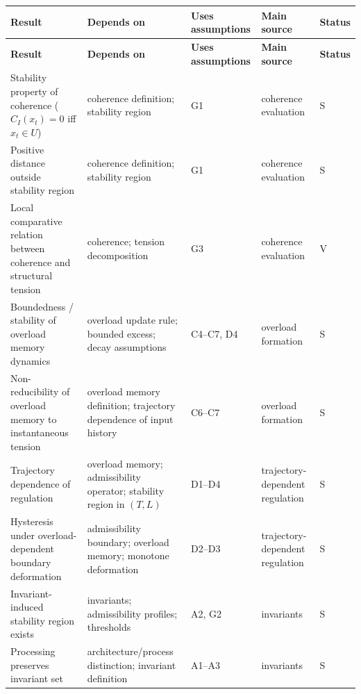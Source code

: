 \documentclass[11pt,a4paper]{article}
\begin{document}
	\begin{longtable}{>{\RaggedRight\arraybackslash}p{}
			>{\RaggedRight\arraybackslash}p{}
			>{\RaggedRight\arraybackslash}p{}
			>{\RaggedRight\arraybackslash}p{}
			>{\RaggedRight\arraybackslash}p{}}
		\toprule
		\textbf{Result} & \textbf{Depends on} & \textbf{Uses assumptions} & \textbf{Main source} & \textbf{Status} \\
		\midrule
		\endfirsthead
		\toprule
		\textbf{Result} & \textbf{Depends on} & \textbf{Uses assumptions} & \textbf{Main source} & \textbf{Status} \\
		\midrule
		\endhead
		
		Stability property of coherence ($C_I(x_t)=0$ iff $x_t \in U$) & coherence definition; stability region & G1 & coherence evaluation & S \\
		
		Positive distance outside stability region & coherence definition; stability region & G1 & coherence evaluation & S \\
		
		Local comparative relation between coherence and structural tension & coherence; tension decomposition & G3 & coherence evaluation & V \\
		
		Boundedness / stability of overload memory dynamics & overload update rule; bounded excess; decay assumptions & C4--C7, D4 & overload formation & S \\
		
		Non-reducibility of overload memory to instantaneous tension & overload memory definition; trajectory dependence of input history & C6--C7 & overload formation & S \\
		
		Trajectory dependence of regulation & overload memory; admissibility operator; stability region in $(T,L)$ & D1--D4 & trajectory-dependent regulation & S \\
		
		Hysteresis under overload-dependent boundary deformation & admissibility boundary; overload memory; monotone deformation & D2--D3 & trajectory-dependent regulation & S \\
		
		Invariant-induced stability region exists & invariants; admissibility profiles; thresholds & A2, G2 & invariants & S \\
		
		Processing preserves invariant set & architecture/process distinction; invariant definition & A1--A3 & invariants & S \\
		

\end{longtable}
\end{document}
